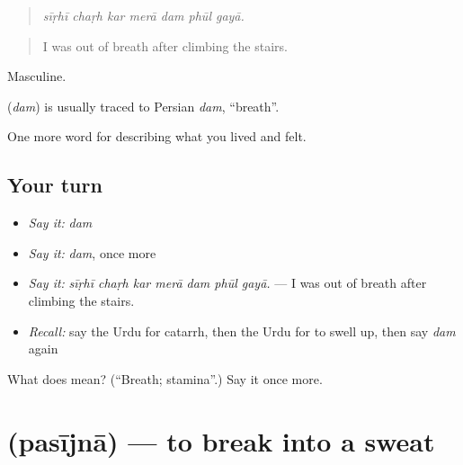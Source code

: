 \begin{quote}
      
\end{quote}

\begin{quote}
\emph{sīṛhī chaṛh kar merā dam phūl gayā.}
\end{quote}

\begin{quote}
I was out of breath after climbing the stairs.
\end{quote}

Masculine.

\begin{cousinweb}
\textbf{} (\emph{dam}) is usually traced to Persian \emph{dam}, \textquotedblleft{}breath\textquotedblright{}.
\end{cousinweb}

\begin{grammarlens}[title={What you've built}]
One more word for describing what you lived and felt.
\end{grammarlens}

\subsection*{Your turn}
\begin{itemize}
\raggedright
  \item \emph{Say it:} \emph{dam}
  \item \emph{Say it:} \emph{dam}, once more
  \item \emph{Say it:} \emph{sīṛhī chaṛh kar merā dam phūl gayā.} — I was out of breath after climbing the stairs.
  \item \emph{Recall:} say the Urdu for catarrh, then the Urdu for to swell up, then say \emph{dam} again
\end{itemize}

\begin{tcolorbox}[breakable,colback=teal!4,colframe=teal!35!black,title={Before you move on}]
What does  mean? (\textquotedblleft{}Breath; stamina\textquotedblright{}.) Say it once more.
\end{tcolorbox}
\section[\texorpdfstring{\ur{پسیجنا} (pasījnā)}{پسیجنا (pasījnā)}]{ (pasījnā) — to break into a sweat}

\label{lesson:UR-C470-pasijna}



